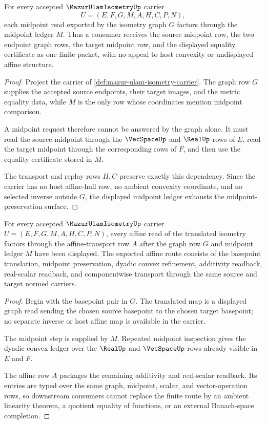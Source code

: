 \begin{theorem}
\label{thm:mazur-ulam-midpoint-preservation}
For every accepted $\MazurUlamIsometryUp$ carrier
$$
U=(E,F,G,M,A,H,C,P,N),
$$
each midpoint read exported by the isometry graph $G$ factors through the midpoint ledger $M$. Thus a consumer receives the source midpoint row, the two endpoint graph rows, the target midpoint row, and the displayed equality certificate as one finite packet, with no appeal to host convexity or undisplayed affine structure.
\end{theorem}
\begin{proof}
Project the carrier of \autoref{def:mazur-ulam-isometry-carrier}. The graph row $G$ supplies the accepted source endpoints, their target images, and the metric equality data, while $M$ is the only row whose coordinates mention midpoint comparison.

A midpoint request therefore cannot be answered by the graph alone. It must read the source midpoint through the $\VecSpaceUp$ and $\RealUp$ rows of $E$, read the target midpoint through the corresponding rows of $F$, and then use the equality certificate stored in $M$.

The transport and replay rows $H,C$ preserve exactly this dependency. Since the carrier has no host affine-hull row, no ambient convexity coordinate, and no selected inverse outside $G$, the displayed midpoint ledger exhausts the midpoint-preservation surface.
\end{proof}

\begin{theorem}
\label{thm:mazur-ulam-affine-linearity}
For every accepted $\MazurUlamIsometryUp$ carrier $U=(E,F,G,M,A,H,C,P,N)$, every affine read of the translated isometry factors through the affine-transport row $A$ after the graph row $G$ and midpoint ledger $M$ have been displayed. The exported affine route consists of the basepoint translation, midpoint preservation, dyadic convex refinement, additivity readback, real-scalar readback, and componentwise transport through the same source and target normed carriers.
\end{theorem}
\begin{proof}
Begin with the basepoint pair in $G$. The translated map is a displayed graph read sending the chosen source basepoint to the chosen target basepoint; no separate inverse or host affine map is available in the carrier.

The midpoint step is supplied by $M$. Repeated midpoint inspection gives the dyadic convex ledger over the $\RealUp$ and $\VecSpaceUp$ rows already visible in $E$ and $F$.

The affine row $A$ packages the remaining additivity and real-scalar readback. Its entries are typed over the same graph, midpoint, scalar, and vector-operation rows, so downstream consumers cannot replace the finite route by an ambient linearity theorem, a quotient equality of functions, or an external Banach-space completion.
\end{proof}

